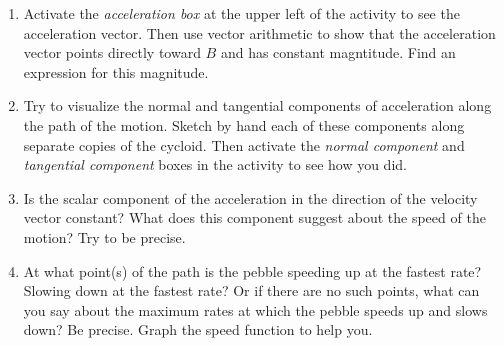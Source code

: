 \documentclass{ximera}
\begin{document}
\begin{question}
\begin{enumerate}
\begin{enumerate}
\item Activate the \emph{acceleration box} at the upper left of the activity to see the acceleration vector. Then use vector arithmetic to show that the acceleration vector points directly toward $B$ and has constant magntitude. Find an expression for this magnitude.

\item Try to visualize the normal and tangential components of acceleration along the path of the motion. Sketch by hand each of these components along separate copies of the cycloid. Then activate the \emph{normal component} and \emph{tangential component} boxes in the activity to see how you did.


\item Is the scalar component of the acceleration in the direction of the velocity vector constant? What does this component suggest about the speed of the motion? Try to be precise.

\item At what point(s) of the path is the pebble speeding up at the fastest rate? Slowing down at the fastest rate? Or if there are no such points, what can you say about the maximum rates at which the pebble speeds up and slows down? Be precise. Graph the speed function to help you.

\end{enumerate}

\end{enumerate}

\end{question}
\end{document}
